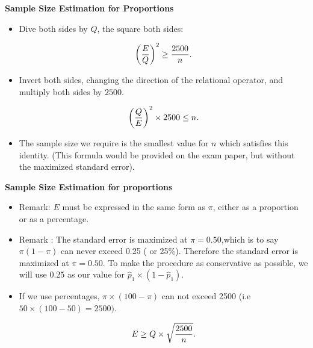 
\noindent \textbf{Sample Size Estimation for Proportions}

\begin{itemize}

\item Dive both sides by $Q$, the square both sides:

\[ \left({E\over Q}\right)^2 \geq {2500 \over n}. \]

\item Invert both sides, changing the direction of the relational operator, and multiply both sides by $2500$.

\[ \left({Q\over E}\right)^2 \times 2500 \leq n. \]

\item The sample size we require is the smallest value for $n$ which satisfies this identity. (This formula would be provided on the exam paper, but without the maximized standard error).
\end{itemize}






\newpage






\textbf{Sample Size Estimation for proportions}
\begin{itemize}
\item Remark: $E$ must be expressed in the same form as $\pi$, either as a proportion or as a percentage.
\item Remark : The standard error is maximized at $\pi = 0.50$,which is to say $\pi(1-\pi)$ can never exceed 0.25 ( or 25\%). Therefore the standard error is maximized at $\pi = 0.50$. To make the procedure as conservative as possible, we will use $0.25$ as our value for $\hat{p}_1 \times (1 - \hat{p}_1)$.
\item If we use percentages, $\pi \times (100-\pi)$ can not exceed 2500 (i.e $ 50 \times (100-50)=2500)$.

\[ E \geq Q \times \sqrt{{2500 \over n}}. \]


\end{itemize}



